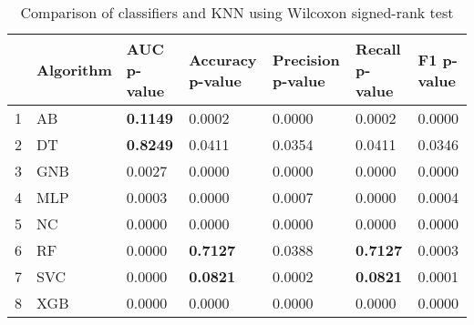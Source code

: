 \begin{table}
\footnotesize
\caption{Comparison of classifiers and KNN using Wilcoxon signed-rank test}
\label{tab:wilcoxon comparison}
\begin{tabular}{lllllll}
\hline
 & Algorithm & AUC p-value & Accuracy p-value & Precision p-value & Recall p-value & F1 p-value \\
\hline
1 & AB & \textbf{0.1149} & 0.0002 & 0.0000 & 0.0002 & 0.0000 \\
2 & DT & \textbf{0.8249} & 0.0411 & 0.0354 & 0.0411 & 0.0346 \\
3 & GNB & 0.0027 & 0.0000 & 0.0000 & 0.0000 & 0.0000 \\
4 & MLP & 0.0003 & 0.0000 & 0.0007 & 0.0000 & 0.0004 \\
5 & NC & 0.0000 & 0.0000 & 0.0000 & 0.0000 & 0.0000 \\
6 & RF & 0.0000 & \textbf{0.7127} & 0.0388 & \textbf{0.7127} & 0.0003 \\
7 & SVC & 0.0000 & \textbf{0.0821} & 0.0002 & \textbf{0.0821} & 0.0001 \\
8 & XGB & 0.0000 & 0.0000 & 0.0000 & 0.0000 & 0.0000 \\
\hline
\end{tabular}
\end{table}
